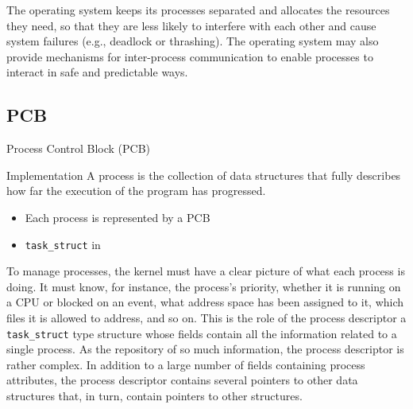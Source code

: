 The operating system keeps its processes separated and allocates the resources they need,
so that they are less likely to interfere with each other and cause system failures (e.g.,
deadlock or thrashing). The operating system may also provide mechanisms for inter-process
communication to enable processes to interact in safe and predictable ways.


\subsection{PCB}
\label{sec:pcb}


\begin{frame}{Process Control Block (PCB)}
  \begin{varwidth}{.7\textwidth}
    \begin{block}{Implementation}
        A process is \alert{the collection of data structures} that fully describes how far
        the execution of the program has progressed.
        \begin{itemize}
        \item Each process is represented by a \alert{PCB}
        \item \texttt{task\_struct} in \linux{}
        \end{itemize}
      \end{block}
    \end{varwidth}\quad
    \begin{varwidth}{.2\textwidth}
      \begin{center}
      \end{center}      
    \end{varwidth}
\end{frame}

To manage processes, the kernel must have a clear picture of what each process is
doing. It must know, for instance, the process's priority, whether it is running on a CPU
or blocked on an event, what address space has been assigned to it, which files it is
allowed to address, and so on. This is the role of the process descriptor a
\texttt{task\_struct} type structure whose fields contain all the information related to a
single process. As the repository of so much information, the process descriptor is rather
complex. In addition to a large number of fields containing process attributes, the
process descriptor contains several pointers to other data structures that, in turn,
contain pointers to other structures.

